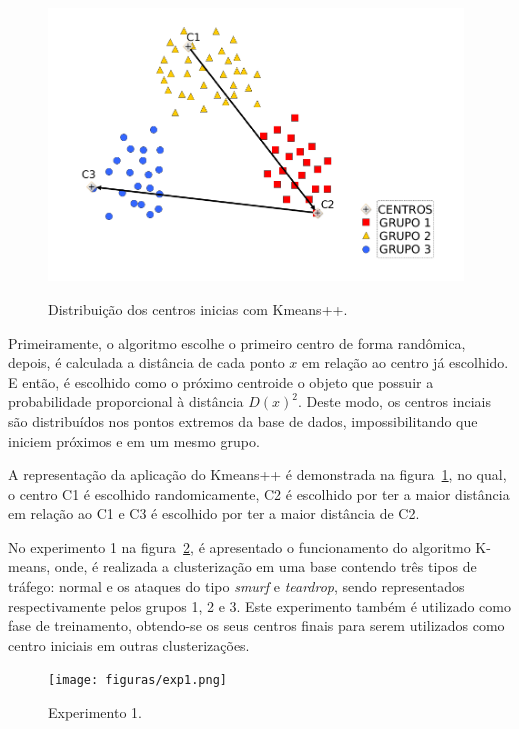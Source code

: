 \begin{figure}[!h]
\centering
\includegraphics[width = 11cm, height = 8cm]{figuras/kmeans++.png}
\caption{\scriptsize{Distribuição dos centros inicias com Kmeans++.}}
\label{fig2}
\end{figure}

\indent Primeiramente, o algoritmo escolhe o primeiro centro de forma randômica, depois, é calculada a distância de cada ponto $x$ em relação ao centro já escolhido. E então, é escolhido como o próximo centroide o objeto que possuir a probabilidade proporcional à distância $D(x)^{2}$. Deste modo, os centros inciais são distribuídos nos pontos extremos da base de dados, impossibilitando que iniciem próximos e em um mesmo grupo.

\indent A representação da aplicação do Kmeans++ é demonstrada na figura~\ref{fig2}, no qual, o centro C1 é escolhido randomicamente, C2 é escolhido por ter a maior distância em relação ao C1 e C3 é escolhido por ter a maior distância de C2.

\indent No experimento 1 na figura~\ref{fig3}, é apresentado o funcionamento do algoritmo K-means, onde, é realizada a clusterização em uma base contendo três tipos de tráfego: normal e os ataques do tipo \textit{smurf} e \textit{teardrop}, sendo representados respectivamente pelos grupos 1, 2 e 3. Este experimento também é utilizado como fase de treinamento, obtendo-se os seus centros finais para serem utilizados como centro iniciais em outras clusterizações.

\begin{figure}[!h]
\centering
\texttt{[image: figuras/exp1.png]}
\caption{\scriptsize{Experimento 1.}}
\label{fig3}
\end{figure}

